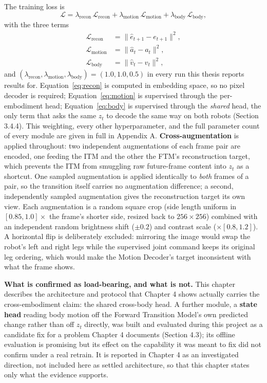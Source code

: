 \documentclass[12pt,a4paper,oneside]{report}
\begin{document}
The training loss is
\[
\mathcal{L} = \lambda_{\text{recon}}\,\mathcal{L}_{\text{recon}} + \lambda_{\text{motion}}\,\mathcal{L}_{\text{motion}}
  + \lambda_{\text{body}}\,\mathcal{L}_{\text{body}},
\]
with the three terms
\begin{align}
\mathcal{L}_{\text{recon}}  &= \lVert \hat{e}_{t+1} - e_{t+1} \rVert^2, \label{eq:recon}\\
\mathcal{L}_{\text{motion}} &= \lVert \hat{a}_t - a_t \rVert^2, \label{eq:motion}\\
\mathcal{L}_{\text{body}}   &= \lVert \hat{v}_t - v_t \rVert^2, \label{eq:body}
\end{align}
and $(\lambda_{\text{recon}}, \lambda_{\text{motion}}, \lambda_{\text{body}}) = (1.0, 1.0, 0.5)$ in every run this
thesis reports results for. Equation~\eqref{eq:recon} is computed in embedding space, so no pixel decoder is
required; Equation~\eqref{eq:motion} is supervised through the per-embodiment head; Equation~\eqref{eq:body} is
supervised through the \emph{shared} head, the only term that asks the same $z_t$ to decode the same way on both
robots (Section 3.4.4). This weighting, every other hyperparameter, and the full parameter count of every module
are given in full in Appendix A.
\textbf{Cross-augmentation} is applied throughout: two independent augmentations of each frame pair are encoded,
one feeding the ITM and the other the FTM's reconstruction target, which prevents the ITM from smuggling raw
future-frame content into $z_t$ as a shortcut. One sampled augmentation is applied identically to \emph{both}
frames of a pair, so the transition itself carries no augmentation difference; a second, independently sampled
augmentation gives the reconstruction target its own view. Each augmentation is a random square crop (side length
uniform in $[0.85, 1.0]\times$ the frame's shorter side, resized back to $256\times256$) combined with an
independent random brightness shift ($\pm0.2$) and contrast scale ($\times[0.8, 1.2]$). A horizontal flip is
deliberately excluded: mirroring the image would swap the robot's left and right legs while the supervised joint
command keeps its original leg ordering, which would make the Motion Decoder's target inconsistent with what the
frame shows.

\textbf{What is confirmed as load-bearing, and what is not.} This chapter describes the architecture and protocol
that Chapter 4 shows actually carries the cross-embodiment claim: the shared cross-body head. A further module,
a \textbf{state head} reading body motion off the Forward Transition Model's own predicted change rather than off
$z_t$ directly, was built and evaluated during this project as a candidate fix for a problem Chapter 4 documents
(Section 4.3); its offline evaluation is promising but its effect on the capability it was meant to fix did not
confirm under a real retrain. It is reported in Chapter 4 as an investigated direction, not included here as
settled architecture, so that this chapter states only what the evidence supports.
\end{document}
